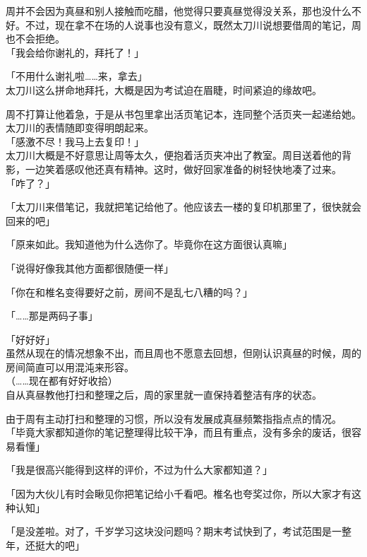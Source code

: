 周并不会因为真昼和别人接触而吃醋，他觉得只要真昼觉得没关系，那也没什么不好。不过，现在拿不在场的人说事也没有意义，既然太刀川说想要借周的笔记，周也不会拒绝。\\

「我会给你谢礼的，拜托了！」

「不用什么谢礼啦……来，拿去」\\

太刀川这么拼命地拜托，大概是因为考试迫在眉睫，时间紧迫的缘故吧。

周不打算让他着急，于是从书包里拿出活页笔记本，连同整个活页夹一起递给她。太刀川的表情随即变得明朗起来。\\

「感激不尽！我马上去复印！」\\

太刀川大概是不好意思让周等太久，便抱着活页夹冲出了教室。周目送着他的背影，一边笑着感叹他还真有精神。这时，做好回家准备的树轻快地凑了过来。\\

「咋了？」

「太刀川来借笔记，我就把笔记给他了。他应该去一楼的复印机那里了，很快就会回来的吧」

「原来如此。我知道他为什么选你了。毕竟你在这方面很认真嘛」

「说得好像我其他方面都很随便一样」

「你在和椎名变得要好之前，房间不是乱七八糟的吗？」

「……那是两码子事」

「好好好」\\

虽然从现在的情况想象不出，而且周也不愿意去回想，但刚认识真昼的时候，周的房间简直可以用混沌来形容。\\

（……现在都有好好收拾）\\

自从真昼教他打扫和整理之后，周的家里就一直保持着整洁有序的状态。

由于周有主动打扫和整理的习惯，所以没有发展成真昼频繁指指点点的情况。\\

「毕竟大家都知道你的笔记整理得比较干净，而且有重点，没有多余的废话，很容易看懂」

「我是很高兴能得到这样的评价，不过为什么大家都知道？」

「因为大伙儿有时会瞅见你把笔记给小千看吧。椎名也夸奖过你，所以大家才有这种认知」

「是没差啦。对了，千岁学习这块没问题吗？期末考试快到了，考试范围是一整年，还挺大的吧」

